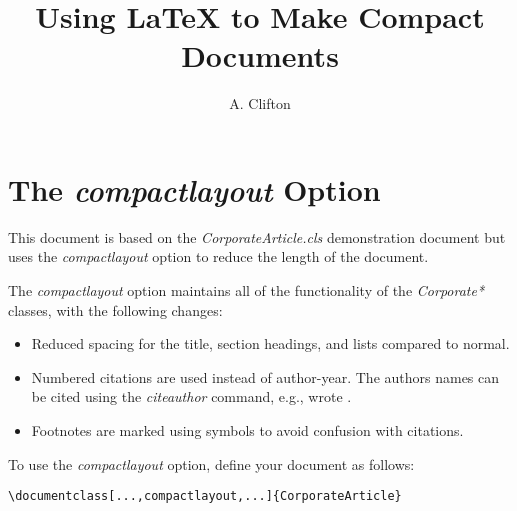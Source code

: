 \documentclass[twocolumn,a4paper,logo,compactlayout]{CorporateArticle}
\title{Using LaTeX to Make Compact Documents}
\author{A. Clifton}
\begin{document}
\lstset{language=[LaTeX]Tex,columns=fullflexible,keepspaces=true,breaklines=true}

\maketitle

\section*{The \emph{compactlayout} Option}

This document is based on the \emph{CorporateArticle.cls} demonstration document but uses the \emph{compactlayout} option to reduce the length of the document.

The \emph{compactlayout} option maintains all of the functionality of the \emph{Corporate*} classes, with the following changes:
\begin{itemize}
\item Reduced spacing for the title, section headings, and lists compared to normal.
\item Numbered citations are used \citep[e.g.,][]{TechReportTest} instead of author-year. The authors names can be cited using the \emph{citeauthor} command, e.g., \citeauthor{TechReportTest} wrote \cite{TechReportTest}.
\item Footnotes are marked using symbols to avoid confusion with citations.  
\end{itemize}

To use the \emph{compactlayout} option, define your document as follows:

\begin{lstlisting}
\documentclass[...,compactlayout,...]{CorporateArticle}
\end{lstlisting}

\clearpage


\tableofcontents
\listoffigures
\listoftables






\label{sec:TheBibliography}
\printbibliography

\appendix


\end{document}
